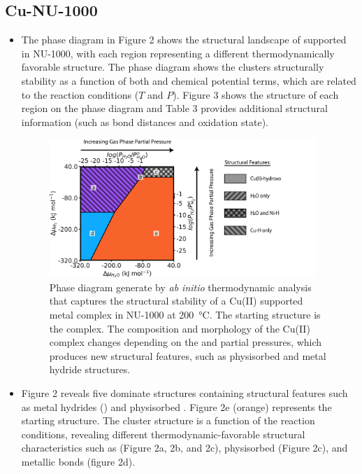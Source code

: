 \documentclass[12pt]{article}
\begin{document}
\subsection{Cu-NU-1000}
\begin{itemize}
    \item The  phase diagram in Figure 2 shows the structural landscape of  supported in NU-1000, with each region representing a different thermodynamically favorable structure. The phase diagram shows the clusters structurally stability as a function of both  and  chemical potential terms, which are related to the reaction conditions ($T$ and $P$). Figure 3 shows the structure of each region on the phase diagram and Table 3 provides additional structural information (such as  bond distances and  oxidation state).  
    \begin{figure}[H]
        \centering
        \includegraphics[width=0.95\textwidth]{zi-images/02-Cu-Graphics/2020-08-05-Cu3-phase-diagram-V01.png}
        \caption{Phase diagram generate by \textit{ab initio} thermodynamic analysis that captures the structural stability of a Cu(II) supported metal complex in NU-1000 at \SI{200}{\celsius}. The starting structure is the  complex. The composition and morphology of the Cu(II) complex changes depending on the  and  partial pressures, which produces new structural features, such as physisorbed  and metal hydride structures.}
        \label{fig:phasediagramCu3}
    \end{figure}
    \item Figure 2 reveals five dominate structures containing structural features such as metal hydrides () and physisorbed . Figure 2e (orange) represents the starting  structure. The cluster structure is a function of the reaction conditions, revealing different thermodynamic-favorable structural characteristics such as  (Figure 2a, 2b, and 2c), physisorbed  (Figure 2c), and metallic  bonds (figure 2d). 

\end{itemize}
\end{document}
